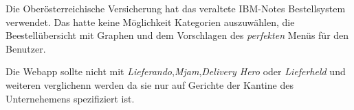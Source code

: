 Die Oberösterreichische Versicherung hat das veraltete IBM-Notes Bestellsystem verwendet. Das hatte keine Möglichkeit Kategorien auszuwählen,
die Beestellübersicht mit Graphen und dem Vorschlagen des \textit{perfekten} Menüs für den Benutzer.

Die Webapp sollte nicht mit \textit{Lieferando},\textit{Mjam},\textit{Delivery Hero} oder \textit{Lieferheld} und weiteren verglichenn werden
da sie nur auf Gerichte der Kantine des Unternehemens spezifiziert ist.